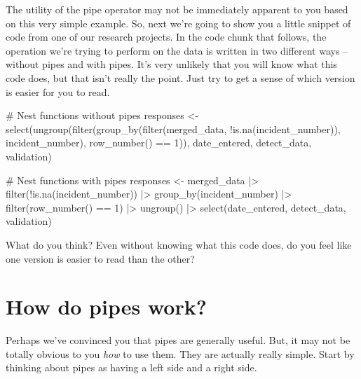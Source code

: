 \documentclass[
  letterpaper,
  DIV=11,
  numbers=noendperiod]{scrreprt}
\newenvironment{Shaded}{\begin{snugshade}}{\end{snugshade}}
\newcommand{\CommentTok}[1]{\textcolor[rgb]{0.37,0.37,0.37}{#1}}
\newcommand{\DecValTok}[1]{\textcolor[rgb]{0.68,0.00,0.00}{#1}}
\newcommand{\FunctionTok}[1]{\textcolor[rgb]{0.28,0.35,0.67}{#1}}
\newcommand{\NormalTok}[1]{\textcolor[rgb]{0.00,0.23,0.31}{#1}}
\newcommand{\OtherTok}[1]{\textcolor[rgb]{0.00,0.23,0.31}{#1}}
\newcommand{\SpecialCharTok}[1]{\textcolor[rgb]{0.37,0.37,0.37}{#1}}
\begin{document}
The utility of the pipe operator may not be immediately apparent to you
based on this very simple example. So, next we're going to show you a
little snippet of code from one of our research projects. In the code
chunk that follows, the operation we're trying to perform on the data is
written in two different ways -- without pipes and with pipes. It's very
unlikely that you will know what this code does, but that isn't really
the point. Just try to get a sense of which version is easier for you to
read.

\begin{Shaded}
\begin{Highlighting}[]
\CommentTok{\# Nest functions without pipes}
\NormalTok{responses }\OtherTok{\textless{}{-}} \FunctionTok{select}\NormalTok{(}\FunctionTok{ungroup}\NormalTok{(}\FunctionTok{filter}\NormalTok{(}\FunctionTok{group\_by}\NormalTok{(}\FunctionTok{filter}\NormalTok{(merged\_data, }\SpecialCharTok{!}\FunctionTok{is.na}\NormalTok{(incident\_number)), incident\_number), }\FunctionTok{row\_number}\NormalTok{() }\SpecialCharTok{==} \DecValTok{1}\NormalTok{)), date\_entered, detect\_data, validation)}

\CommentTok{\# Nest functions with pipes}
\NormalTok{responses }\OtherTok{\textless{}{-}}\NormalTok{ merged\_data }\SpecialCharTok{|\textgreater{}} 
  \FunctionTok{filter}\NormalTok{(}\SpecialCharTok{!}\FunctionTok{is.na}\NormalTok{(incident\_number)) }\SpecialCharTok{|\textgreater{}} 
  \FunctionTok{group\_by}\NormalTok{(incident\_number) }\SpecialCharTok{|\textgreater{}} 
  \FunctionTok{filter}\NormalTok{(}\FunctionTok{row\_number}\NormalTok{() }\SpecialCharTok{==} \DecValTok{1}\NormalTok{) }\SpecialCharTok{|\textgreater{}} 
  \FunctionTok{ungroup}\NormalTok{() }\SpecialCharTok{|\textgreater{}} 
  \FunctionTok{select}\NormalTok{(date\_entered, detect\_data, validation)}
\end{Highlighting}
\end{Shaded}

What do you think? Even without knowing what this code does, do you feel
like one version is easier to read than the other?

\section{How do pipes work?}\label{how-do-pipes-work}

Perhaps we've convinced you that pipes are generally useful. But, it may
not be totally obvious to you \emph{how} to use them. They are actually
really simple. Start by thinking about pipes as having a left side and a
right side.
\end{document}
